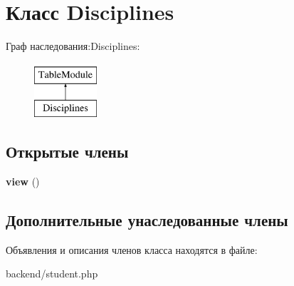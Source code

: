\hypertarget{classDisciplines}{}\section{Класс Disciplines}
\label{classDisciplines}
Граф наследования\+:Disciplines\+:\begin{figure}[H]
\begin{center}
\leavevmode
\includegraphics[height=2.000000cm]{classDisciplines}
\end{center}
\end{figure}
\subsection*{Открытые члены}
\begin{DoxyCompactItemize}
\item 
\hypertarget{classDisciplines_a68fc713c8f3709f5f41d7f64009f4f0b}{}{\bfseries view} ()\label{classDisciplines_a68fc713c8f3709f5f41d7f64009f4f0b}

\end{DoxyCompactItemize}
\subsection*{Дополнительные унаследованные члены}


Объявления и описания членов класса находятся в файле\+:\begin{DoxyCompactItemize}
\item 
backend/student.\+php\end{DoxyCompactItemize}
